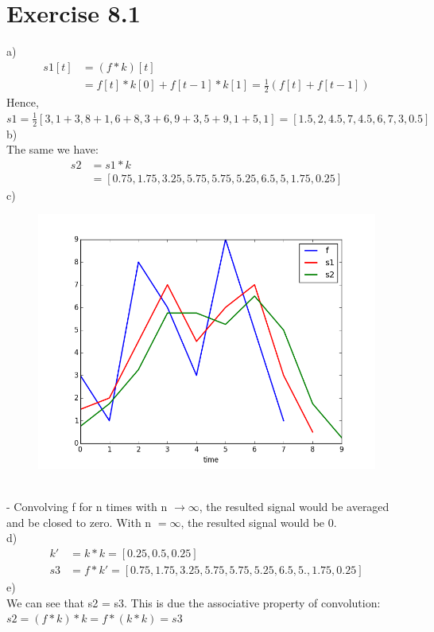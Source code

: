 \documentclass{article}
\begin{document}
\section*{Exercise 8.1}
a)\\
\begin{align*}
s1[t] &= (f*k)[t]\\
&= f[t] * k[0] + f[t-1] * k[1] = \frac{1}{2}(f[t] + f[t-1])
\end{align*}
Hence, $s1 = \frac{1}{2}[3, 1 + 3, 8 + 1, 6 + 8, 3 + 6, 9 + 3, 5 + 9, 1 + 5, 1] = [1.5, 2, 4.5, 7, 4.5, 6, 7, 3, 0.5]$\\
b)\\
The same we have:
\begin{align*}
s2 &= s1 * k\\
&= [0.75, 1.75, 3.25, 5.75, 5.75, 5.25, 6.5, 5, 1.75, 0.25]
\end{align*}
c)
\begin{figure}[ht]
\centering
\includegraphics[scale=0.5]{81c.png}
\end{figure}\\
- Convolving f for n times with n $\to \infty$, the resulted signal would be averaged and be closed to zero. With n $= \infty$, the resulted signal would be 0.\\
d)
\begin{align*}
k' &= k * k = [0.25, 0.5, 0.25]\\
s3 &= f * k' = [ 0.75,  1.75,  3.25,  5.75,  5.75,  5.25,  6.5 ,  5.  ,  1.75,  0.25]
\end{align*}
e)\\
We can see that s2 = s3. This is due the associative property of convolution: $s2 = (f * k) * k = f * (k * k) = s3$\\
\end{document}
